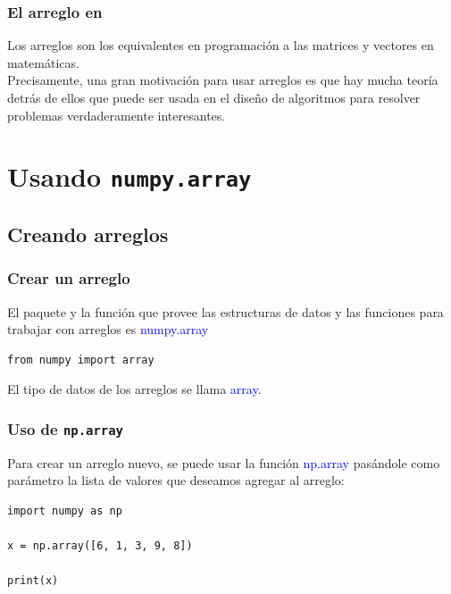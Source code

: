 \begin{frame}
\frametitle{El arreglo en \python}
Los arreglos son los equivalentes en programación a las matrices y vectores en matemáticas.
\\
\bigskip
Precisamente, una gran motivación para usar arreglos es que hay mucha teoría detrás de ellos que puede ser usada en el diseño de algoritmos para resolver problemas verdaderamente interesantes.
\end{frame}
\section{Usando \texttt{numpy.array}}
\subsection{Creando arreglos}
\begin{frame}[fragile]
\frametitle{Crear un arreglo}
El paquete y la función que provee las estructuras de datos y las funciones para trabajar con arreglos es \textcolor{blue}{numpy.array}
\begin{verbatim}
from numpy import array
\end{verbatim}
El tipo de datos de los arreglos se llama \textcolor{blue}{array}.
\end{frame}
\begin{frame}[fragile]
\frametitle{Uso de \texttt{np.array}}
Para crear un arreglo nuevo, se puede usar la función \textcolor{blue}{np.array} pasándole como parámetro la lista de valores que deseamos agregar al arreglo:
\begin{lstlisting}[caption=Ejemplo de un arreglo, basicstyle=\linespread{1.1}\ttfamily=\small, columns=fullflexible]
import numpy as np

x = np.array([6, 1, 3, 9, 8])

print(x)
\end{lstlisting}
\end{frame}
